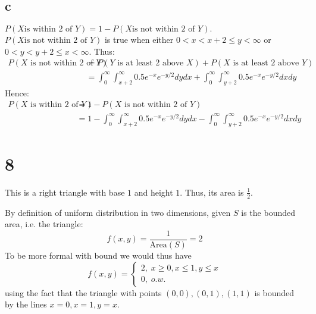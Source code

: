 \documentclass[10pt]{article}
\begin{document}
\subsection*{c}
$P(X \text{is within 2 of } Y) = 1 - P(X \text{is not within 2 of } Y).$ $P(X \text{is not within 2 of } Y)$ is true when either $0<x<x+2\le y<\infty$ or $0<y<y+2\le x<\infty.$ Thus:
\begin{align*}
    P(X \text{ is not within 2 of } Y) &=  P(Y \text{ is at least 2 above } X) + P(X \text{ is at least 2 above } Y)\\
    &= \int_0^\infty\int_{x+2}^\infty 0.5e^{-x}e^{-y/2}dydx +  \int_0^\infty\int_{y+2}^\infty 0.5e^{-x}e^{-y/2}dxdy
\end{align*}
Hence:
\begin{align*}
    P(X \text{ is within 2 of } Y) &= 1 - P(X \text{ is not within 2 of } Y)\\
    &= 1- \int_0^\infty\int_{x+2}^\infty 0.5e^{-x}e^{-y/2}dydx -  \int_0^\infty\int_{y+2}^\infty 0.5e^{-x}e^{-y/2}dxdy
\end{align*}

\section*{8}
This is a right triangle with base $1$ and height $1$. Thus, its area is $\frac{1}{2}.$

By definition of uniform distribution in two dimensions, given $S$ is the bounded area, i.e. the triangle:
\[f(x,y)=\frac{1}{\text{Area}(S)}=2\]
To be more formal with bound we would thus have 
\begin{equation*}
    f(x,y)=\begin{cases}
        2,\; x\ge0,x\le1,y\le x\\
        0,\; o.w.
    \end{cases}
\end{equation*}
using the fact that the triangle with points $(0,0), (0,1), (1,1)$ is bounded by the lines $x=0,x=1,y=x.$
\end{document}
